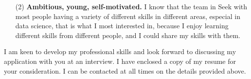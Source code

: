 \documentclass[11pt, a4paper]{awesome-cv}
\begin{document}
\begin{cvletter}
\begin{itemize}
    
    \item[(2)]\textbf{Ambitious, young, self-motivated.} I know that the team in Seek with most people having a variety of different skills in different areas, especial in data science, that is what I most interested in, because I enjoy learning different skills from different people, and I could share my skills with them. 
\end{itemize}

I am keen to develop my professional skills and look forward to discussing my application with you at an interview. I have enclosed a copy of my resume for your consideration. I can be contacted at all times on the details provided above.


\end{cvletter}




\makeletterclosing
\end{document}

